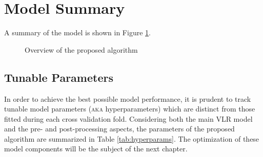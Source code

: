 \section{Model Summary}



A summary of the model is shown in Figure \ref{fig:modelsum}.
\begin{figure}
  \centering\scalebox{0.65}{}
  \caption{Overview of the proposed algorithm}
  \label{fig:modelsum}
\end{figure}
\subsection{Tunable Parameters}
In order to achieve the best possible model performance, it is prudent to track tunable model parameters (\textsc{aka} hyperparameters) which are distinct from those fitted during each cross validation fold. Considering both the main VLR model and the pre- and post-processing aspects, the parameters of the proposed algorithm are summarized in Table \ref{tab:hyperparams}. The optimization of these model components will be the subject of the next chapter. 
